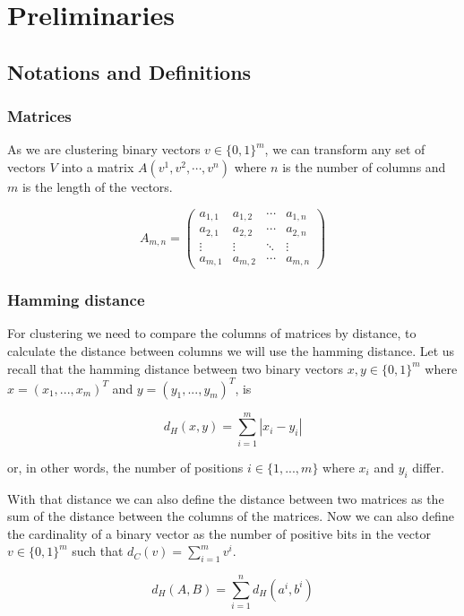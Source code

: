 \documentclass[a4paper]{article}
\begin{document}
%
%

\newpage

\section{Preliminaries}
\subsection{Notations and Definitions}
\subsubsection{Matrices}
As we are clustering binary vectors $v \in \{0,1\}^m$, we can transform any set of vectors
$V$ into a matrix $A(v^1, v^2, \cdots, v^n)$ where $n$ is the number of columns
and $m$ is the length of the vectors.

\[
    A_{m,n} =
    \begin{pmatrix}
        a_{1,1} & a_{1,2} & \cdots & a_{1,n} \\
        a_{2,1} & a_{2,2} & \cdots & a_{2,n} \\
        \vdots  & \vdots  & \ddots & \vdots  \\
        a_{m,1} & a_{m,2} & \cdots & a_{m,n}
    \end{pmatrix}
\]

\subsubsection{Hamming distance}
For clustering we need to compare the columns of matrices by distance, to calculate the distance
between columns we will use the hamming distance. Let us recall that the hamming distance
between two binary vectors $x,y \in \{0,1\}^m$ where $x=(x_1,...,x_m)^T$ and
$y=(y_1,...,y_m)^T$, is

\[
    d_H(x,y)= \sum_{i = 1}^{m} |x_i - y_i|
\]

or, in other words, the number of positions $i \in \{1,...,m\}$ where $x_i$ and $y_i$ differ.

With that distance we can
also define the distance between two matrices as the sum of the distance between the columns of
the matrices. Now we can also define the cardinality of a binary vector as the number of positive bits in
the vector $v \in \{0,1\}^m$ such that $d_C(v)=\sum_{i = 1}^{m} v^i$.

\[
    d_H(A,B) = \sum_{i = 1}^{n} d_H(a^i, b^i)
\]
\end{document}
